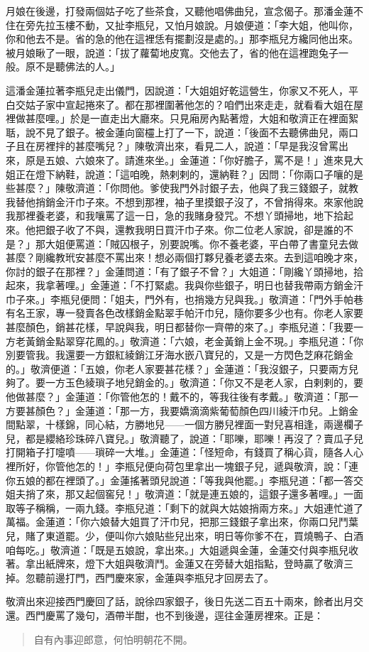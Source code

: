月娘在後邊，打發兩個姑子吃了些茶食，又聽他唱佛曲兒，宣念偈子。那潘金蓮不住在旁先拉玉樓不動，又扯李瓶兒，又怕月娘說。月娘便道：「李大姐，他叫你，你和他去不是。省的急的他在這裡恁有擺劃沒是處的。」那李瓶兒方纔同他出來。被月娘瞅了一眼，說道：「拔了蘿蔔地皮寬。交他去了，省的他在這裡跑兔子一般。原不是聽佛法的人。」

這潘金蓮拉著李瓶兒走出儀門，因說道：「大姐姐好乾這營生，你家又不死人，平白交姑子家中宣起捲來了。都在那裡圍著他怎的？咱們出來走走，就看看大姐在屋裡做甚麼哩。」於是一直走出大廳來。只見廂房內點著燈，大姐和敬濟正在裡面絮聒，說不見了銀子。被金蓮向窗欞上打了一下，說道：「後面不去聽佛曲兒，兩口子且在房裡拌的甚麼嘴兒？」陳敬濟出來，看見二人，說道：「早是我沒曾罵出來，原是五娘、六娘來了。請進來坐。」金蓮道：「你好膽子，罵不是！」進來見大姐正在燈下納鞋，說道：「這咱晚，熱剌剌的，還納鞋？」因問：「你兩口子嚷的是些甚麼？」陳敬濟道：「你問他。爹使我門外討銀子去，他與了我三錢銀子，就教我替他捎銷金汗巾子來。不想到那裡，袖子里摸銀子沒了，不曾捎得來。來家他說我那裡養老婆，和我嚷罵了這一日，急的我賭身發咒。不想丫頭掃地，地下拾起來。他把銀子收了不與，還教我明日買汗巾子來。你二位老人家說，卻是誰的不是？」那大姐便罵道：「賊囚根子，別要說嘴。你不養老婆，平白帶了書童兒去做甚麼？剛纔教玳安甚麼不罵出來！想必兩個打夥兒養老婆去來。去到這咱晚才來，你討的銀子在那裡？」金蓮問道：「有了銀子不曾？」大姐道：「剛纔丫頭掃地，拾起來，我拿著哩。」金蓮道：「不打緊處。我與你些銀子，明日也替我帶兩方銷金汗巾子來。」李瓶兒便問：「姐夫，門外有，也捎幾方兒與我。」敬濟道：「門外手帕巷有名王家，專一發賣各色改樣銷金點翠手帕汗巾兒，隨你要多少也有。你老人家要甚麼顏色，銷甚花樣，早說與我，明日都替你一齊帶的來了。」李瓶兒道：「我要一方老黃銷金點翠穿花鳳的。」敬濟道：「六娘，老金黃銷上金不現。」李瓶兒道：「你別要管我。我還要一方銀紅綾銷江牙海水嵌八寶兒的，又是一方閃色芝麻花銷金的。」敬濟便道：「五娘，你老人家要甚花樣？」金蓮道：「我沒銀子，只要兩方兒夠了。要一方玉色綾瑣子地兒銷金的。」敬濟道：「你又不是老人家，白剌剌的，要他做甚麼？」金蓮道：「你管他怎的！戴不的，等我往後有孝戴。」敬濟道：「那一方要甚顏色？」金蓮道：「那一方，我要嬌滴滴紫葡萄顏色四川綾汗巾兒。上銷金間點翠，十樣錦，同心結，方勝地兒——一個方勝兒裡面一對兒喜相逢，兩邊欄子兒，都是纓絡珍珠碎八寶兒。」敬濟聽了，說道：「耶嚛，耶嚛！再沒了？賣瓜子兒打開箱子打嚏噴——瑣碎一大堆。」金蓮道：「怪短命，有錢買了稱心貨，隨各人心裡所好，你管他怎的！」李瓶兒便向荷包里拿出一塊銀子兒，遞與敬濟，說：「連你五娘的都在裡頭了。」金蓮搖著頭兒說道：「等我與他罷。」李瓶兒道：「都一答交姐夫捎了來，那又起個窖兒！」敬濟道：「就是連五娘的，這銀子還多著哩。」一面取等子稱稱，一兩九錢。李瓶兒道：「剩下的就與大姑娘捎兩方來。」大姐連忙道了萬福。金蓮道：「你六娘替大姐買了汗巾兒，把那三錢銀子拿出來，你兩口兒鬥葉兒，賭了東道罷。少，便叫你六娘貼些兒出來，明日等你爹不在，買燒鴨子、白酒咱每吃。」敬濟道：「既是五娘說，拿出來。」大姐遞與金蓮，金蓮交付與李瓶兒收著。拿出紙牌來，燈下大姐與敬濟鬥。金蓮又在旁替大姐指點，登時贏了敬濟三掉。忽聽前邊打門，西門慶來家，金蓮與李瓶兒才回房去了。

敬濟出來迎接西門慶回了話，說徐四家銀子，後日先送二百五十兩來，餘者出月交還。西門慶罵了幾句，酒帶半酣，也不到後邊，逕往金蓮房裡來。正是：
\begin{quote}
自有內事迎郎意，何怕明朝花不開。
\end{quote}
